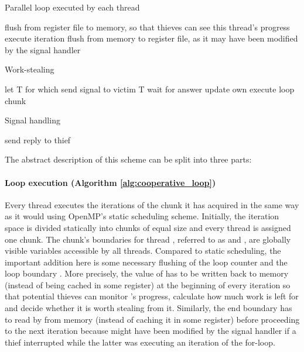 \documentclass{acm_proc_article-sp}
\begin{document}
\begin{algorithm}[h]
\caption{Parallel loop executed by each thread}
\label{alg:cooperative_loop}
\begin{algorithmic}
\For{; ; }
\State flush  \Comment from register file to memory, so that
\State \Comment thieves can see this thread's progress
\State execute  iteration
\State 
\State flush  \Comment from memory to register file, as it may
\State \Comment have been modified by the signal handler
\EndFor
\end{algorithmic}
\end{algorithm}

\begin{algorithm}[h]
\caption{Work-stealing}
\label{alg:cooperative_steal}
\begin{algorithmic}
\State 
\EndFor
\State let T   for which 
\State send signal to victim T
\State wait for answer
\State update own 
\State execute loop chunk
\end{algorithmic}
\end{algorithm}

\begin{algorithm}[h]
\caption{Signal handling}
\label{alg:cooperative_sighandler}
\begin{algorithmic}
\State 
\If{}
\State 
\State 
\State 
\State 
\EndIf
\State send reply to thief
\end{algorithmic}
\end{algorithm}

The abstract description of this scheme can be split into three parts:

\paragraph{Loop execution (Algorithm \ref{alg:cooperative_loop})}
Every thread executes the iterations of the chunk it has acquired in the same 
way as it would using OpenMP's static scheduling scheme. Initially, the 
iteration space is divided statically into chunks of equal size and every 
thread  is assigned one chunk. The chunk's boundaries for thread , 
referred to as  and , are globally visible 
variables accessible by all threads. Compared to static scheduling, the 
important addition here is some necessary flushing of the loop counter 
 and the loop boundary . More precisely, the value of 
 has to be written back to memory (instead of being cached in some 
register) at the beginning of every iteration so that potential thieves can 
monitor 's progress, calculate how much work is left for  and decide 
whether it is worth stealing from it. Similarly, the end boundary  
has to read by  from memory (instead of caching it in some register) 
before proceeding to the next iteration because  might have been 
modified by the signal handler if a thief interrupted  while the latter 
was executing an iteration of the for-loop.
\end{document}
